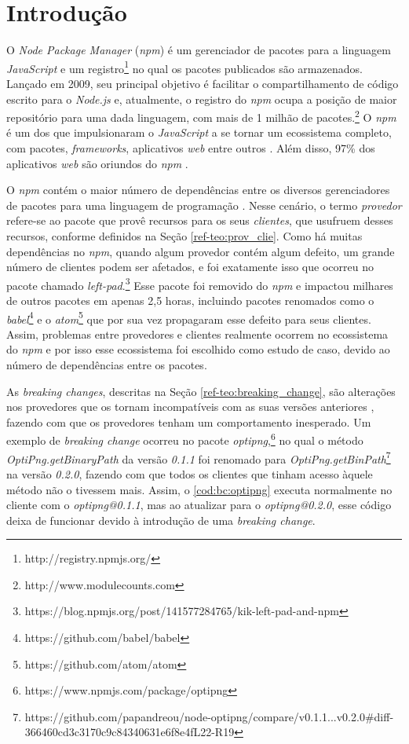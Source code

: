 \chapter{Introdução}
\label{cap:introducao}

O \textit{Node Package Manager} (\textit{npm}) é um gerenciador de pacotes para a linguagem \textit{JavaScript} e um registro\footnote{http://registry.npmjs.org/} no qual os pacotes publicados são armazenados. Lançado em 2009, seu principal objetivo é facilitar o compartilhamento de código escrito para o \textit{Node.js} e, atualmente, o registro do \textit{npm} ocupa a posição de maior repositório para uma dada linguagem, com mais de 1 milhão de pacotes.\footnote{http://www.modulecounts.com} O \textit{npm} é um dos que impulsionaram o \textit{JavaScript} a se tornar um ecossistema completo, com pacotes, \textit{frameworks}, aplicativos \textit{web} entre outros \cite{introduction:npm}. Além disso,  97\% dos aplicativos \textit{web} são oriundos do \textit{npm} \cite{stack_research}.

O \textit{npm} contém o maior número de dependências entre os diversos gerenciadores de pacotes para uma linguagem de programação \cite{teorical_reference:npm_2}. Nesse cenário, o termo \textit{provedor} refere-se ao pacote que provê recursos para os seus \textit{clientes}, que usufruem desses recursos, conforme definidos na Seção \ref{ref-teo:prov_clie}. Como há muitas dependências no \textit{npm}, quando algum provedor contém algum defeito, um grande número de clientes podem ser afetados, e foi exatamente isso que ocorreu no pacote chamado \textit{left-pad}.\footnote{https://blog.npmjs.org/post/141577284765/kik-left-pad-and-npm} Esse pacote foi removido do \textit{npm} e impactou milhares de outros pacotes em apenas 2,5 horas, incluindo pacotes renomados como o \textit{babel}\footnote{https://github.com/babel/babel} e o \textit{atom}\footnote{https://github.com/atom/atom} que por sua vez propagaram esse defeito para seus clientes. Assim, problemas entre provedores e clientes realmente ocorrem no ecossistema do \textit{npm} e por isso esse ecossistema foi escolhido como estudo de caso, devido ao número de dependências entre os pacotes.

As \textit{breaking changes}, descritas na Seção \ref{ref-teo:breaking_change}, são alterações nos provedores que os tornam incompatíveis com as suas versões anteriores \cite{intro:break_change}, fazendo com que os provedores tenham um comportamento inesperado. Um exemplo de \textit{breaking change} ocorreu no pacote \textit{optipng},\footnote{https://www.npmjs.com/package/optipng} no qual o método \textit{OptiPng.getBinaryPath} da versão \textit{0.1.1} foi renomado para \textit{OptiPng.getBinPath}\footnote{https://github.com/papandreou/node-optipng/compare/v0.1.1...v0.2.0\#diff-366460cd3c3170c9c84340631e6f8e4fL22-R19} na versão \textit{0.2.0}, fazendo com que todos os clientes que tinham acesso àquele método não o tivessem mais. Assim, o \cref{cod:bc:optipng} executa normalmente no cliente com o \textit{optipng@0.1.1}, mas ao atualizar para o \textit{optipng@0.2.0}, esse código deixa de funcionar devido à introdução de uma \textit{breaking change}.

